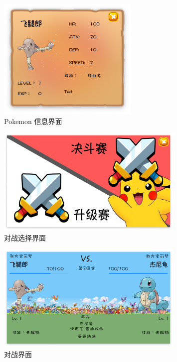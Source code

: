 \begin{figure}[H]
    \centering
    \includegraphics[width=0.6\textwidth]{pokemon.png}
    \caption{Pokemon 信息界面}
\end{figure}

\begin{figure}[H]
    \centering
    \includegraphics[width=0.8\textwidth]{choose.png}
    \caption{对战选择界面}
\end{figure}

\begin{figure}[H]
    \centering
    \includegraphics[width=0.8\textwidth]{battle.png}
    \caption{对战界面}
\end{figure}


